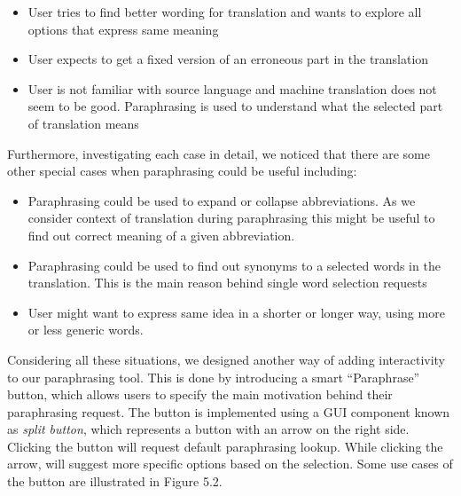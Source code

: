 \begin{itemize}
    \item User tries to find better wording for translation and wants to explore all options that express same meaning
    \item User expects to get a fixed version of an erroneous part in the translation
    \item User is not familiar with source language and machine translation does not seem to be good. Paraphrasing is used to understand what the selected part of translation means  
\end{itemize}

Furthermore, investigating each case in detail, we noticed that there are some other special cases when paraphrasing could be useful including:

\begin{itemize}
    \item Paraphrasing could be used to expand or collapse abbreviations. As we consider context of translation during paraphrasing this might be useful to find out correct meaning of a given abbreviation.

    \item Paraphrasing could be used to find out synonyms to a selected words in the translation. This is the main reason behind single word selection requests

    \item User might want to express same idea in a shorter or longer way, using more or less generic words. 
\end{itemize}

Considering all these situations, we designed another way of adding interactivity to our paraphrasing tool. This is done by introducing a smart ``Paraphrase'' button, which allows users to specify the main motivation behind their paraphrasing request. The button is implemented using a GUI component known as \emph{split button}, which represents a button with an arrow on the right side. Clicking the button will request default paraphrasing lookup. While clicking the arrow, will suggest more specific options based on the selection. Some use cases of the button are illustrated in Figure 5.2.   

